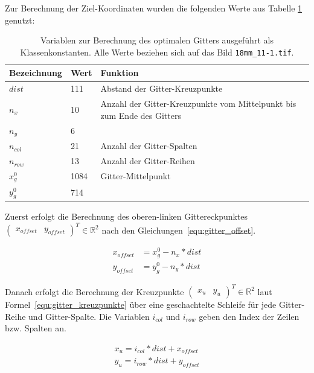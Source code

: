 Zur Berechnung der Ziel-Koordinaten wurden die folgenden Werte aus Tabelle \ref{tab:gitter_koordinaten_variablen} genutzt:

\begin{table}[H]
\centering
\begin{tabular}{|l|l|p{}|}
\hline
\textbf{Bezeichnung} & \textbf{Wert} & \textbf{Funktion}\\
\hline
$dist$ & 111 & Abstand der Gitter-Kreuzpunkte\\
\hline
$n_x$ & 10 & Anzahl der Gitter-Kreuzpunkte vom Mittelpunkt bis zum Ende des Gitters\\
$n_y$ & 6 & \\
\hline
$n_{col}$ & 21 & Anzahl der Gitter-Spalten\\
$n_{row}$ & 13 & Anzahl der Gitter-Reihen\\
\hline
$x_g^0$ & 1084 & Gitter-Mittelpunkt \\
$y_g^0$ & 714 & \\
\hline
\end{tabular}
\caption{Variablen zur Berechnung des optimalen Gitters ausgeführt als Klassenkonstanten. Alle Werte beziehen sich auf das Bild \texttt{18mm\_11-1.tif}. }
\label{tab:gitter_koordinaten_variablen}
\end{table}

Zuerst erfolgt die Berechnung des oberen-linken Gittereckpunktes $\begin{pmatrix}
x_{offset} & y_{offset}\end{pmatrix}^T \in \mathbb{R}^2$  nach den Gleichungen~\ref{equ:gitter_offset}. 

\begin{equation}
\label{equ:gitter_offset}
\begin{aligned}
x_{offset} &= x_g^0 - n_x * dist\\
y_{offset} &= y_g^0 - n_y * dist
\end{aligned}
\end{equation}

Danach erfolgt die Berechnung der Kreuzpunkte $\begin{pmatrix}x_{u} & y_{u}\end{pmatrix}^T \in \mathbb{R}^2$ laut Formel~\ref{equ:gitter_kreuzpunkte} über eine geschachtelte Schleife für jede Gitter-Reihe und Gitter-Spalte. Die Variablen $i_{col}$ und $i_{row}$ geben den Index der Zeilen bzw. Spalten an.

\begin{equation}
\label{equ:gitter_kreuzpunkte}
\begin{split}
x_{u} = i_{col} * dist + x_{offset}\\
y_{u} = i_{row} * dist + y_{offset}
\end{split}
\end{equation}

